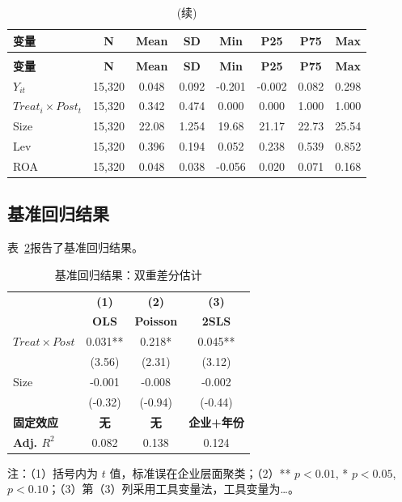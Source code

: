 \documentclass[lang=cn, aaffiliation={中国}]{ctexart}
\begin{document}
\begin{longtable}{lccccccc}
    \caption{描述性统计}
    \label{tab:desc}\\
    \toprule
    \textbf{变量} & \textbf{N} & \textbf{Mean} & \textbf{SD} & \textbf{Min} & \textbf{P25} & \textbf{P75} & \textbf{Max} \\
    \midrule
    \endfirsthead
    \caption{(续)}\\
    \toprule
    \textbf{变量} & \textbf{N} & \textbf{Mean} & \textbf{SD} & \textbf{Min} & \textbf{P25} & \textbf{P75} & \textbf{Max} \\
    \midrule
    \endhead
    \bottomrule
    \endfoot
    $Y_{it}$ & 15,320 & 0.048 & 0.092 & -0.201 & -0.002 & 0.082 & 0.298 \\
    $Treat_i \times Post_t$ & 15,320 & 0.342 & 0.474 & 0.000 & 0.000 & 1.000 & 1.000 \\
    Size & 15,320 & 22.08 & 1.254 & 19.68 & 21.17 & 22.73 & 25.54 \\
    Lev & 15,320 & 0.396 & 0.194 & 0.052 & 0.238 & 0.539 & 0.852 \\
    ROA & 15,320 & 0.048 & 0.038 & -0.056 & 0.020 & 0.071 & 0.168 \\
\end{longtable}

\subsection{基准回归结果}
\label{sec:baseline}

表~\ref{tab:did}报告了基准回归结果。

\begin{table}[htbp]
    \centering
    \caption{基准回归结果：双重差分估计}
    \label{tab:did}
    \begin{threeparttable}
        \begin{tabular}{lccc}
            \toprule
            \textbf{} & \textbf{(1)} & \textbf{(2)} & \textbf{(3)} \\
            & \textbf{OLS} & \textbf{Poisson} & \textbf{2SLS} \\
            \midrule
            $Treat \times Post$ & 0.031\*** & 0.218\** & 0.045\*** \\
              & (3.56) & (2.31) & (3.12) \\
            Size & -0.001 & -0.008 & -0.002 \\
              & (-0.32) & (-0.94) & (-0.44) \\
            \midrule
            \textbf{固定效应} & \textbf{无} & \textbf{无} & \textbf{企业+年份} \\
            \textbf{Adj. $R^2$} & 0.082 & 0.138 & 0.124 \\
            \bottomrule
        \end{tabular}
        \begin{tablenotes}\footnotesize
            \item 注：（1）括号内为 $t$ 值，标准误在企业层面聚类；（2）\*** $p<0.01$, \** $p<0.05$, \* $p<0.10$；（3）第（3）列采用工具变量法，工具变量为\dots。
        \end{tablenotes}
    \end{threeparttable}
\end{table}
\end{document}
